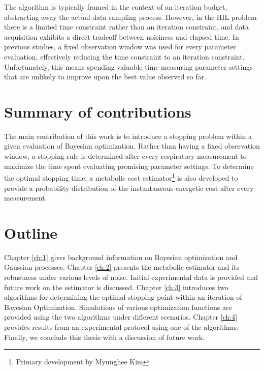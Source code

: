 The algorithm is typically framed in the context of an iteration budget, abstracting away the actual data sampling process. However, in the HIL problem there is a limited time constraint rather than an iteration constraint, and data acquisition exhibits a direct tradeoff between noisiness and elapsed time. In previous studies, a fixed observation window was used for every parameter evaluation, effectively reducing the time constraint to an iteration constraint. Unfortunately, this means spending valuable time measuring parameter settings that are unlikely to improve upon the best value observed so far.

\section*{Summary of contributions}
The main contribution of this work is to introduce a stopping problem within a given evaluation of Bayesian optimization. Rather than having a fixed observation window, a stopping rule is determined after every respiratory measurement to maximize the time spent evaluating promising parameter settings. To determine the optimal stopping time, a metabolic cost estimator\footnote{Primary development by Myunghee Kim} is also developed to provide a probability distribution of the instantaneous energetic cost after every measurement.

\section*{Outline}
Chapter \ref{ch:1} gives background information on Bayesian optimization and Gaussian processes. Chapter \ref{ch:2} presents the metabolic estimator and its robustness under various levels of noise. Initial experimental data is provided and future work on the estimator is discussed. Chapter \ref{ch:3} introduces two algorithms for determining the optimal stopping point within an iteration of Bayesian Optimization. Simulations of various optimization functions are provided using the two algorithms under different scenarios. Chapter \ref{ch:4} provides results from an experimental protocol using one of the algorithms. Finally, we conclude this thesis with a discussion of future work.